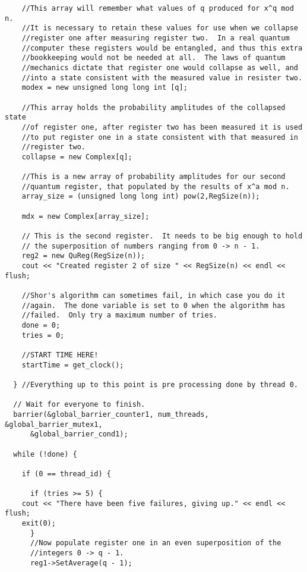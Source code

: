 \documentclass[]{article}
\begin{document}
\begin{verbatim}
    //This array will remember what values of q produced for x^q mod n.
    //It is necessary to retain these values for use when we collapse
    //register one after measuring register two.  In a real quantum
    //computer these registers would be entangled, and thus this extra
    //bookkeeping would not be needed at all.  The laws of quantum
    //mechanics dictate that register one would collapse as well, and
    //into a state consistent with the measured value in resister two.
    modex = new unsigned long long int [q];     
    
    //This array holds the probability amplitudes of the collapsed state
    //of register one, after register two has been measured it is used
    //to put register one in a state consistent with that measured in
    //register two.
    collapse = new Complex[q];
  
    //This is a new array of probability amplitudes for our second
    //quantum register, that populated by the results of x^a mod n.
    array_size = (unsigned long long int) pow(2,RegSize(n));
    
    mdx = new Complex[array_size]; 
    
    // This is the second register.  It needs to be big enough to hold
    // the superposition of numbers ranging from 0 -> n - 1.
    reg2 = new QuReg(RegSize(n)); 
    cout << "Created register 2 of size " << RegSize(n) << endl << flush;
    
    //Shor's algorithm can sometimes fail, in which case you do it
    //again.  The done variable is set to 0 when the algorithm has
    //failed.  Only try a maximum number of tries.
    done = 0;
    tries = 0;
    
    //START TIME HERE!
    startTime = get_clock();
    
  } //Everything up to this point is pre processing done by thread 0.

  // Wait for everyone to finish.
  barrier(&global_barrier_counter1, num_threads, &global_barrier_mutex1, 
	  &global_barrier_cond1);

  while (!done) {
    
    if (0 == thread_id) {
      
      if (tries >= 5) {
	cout << "There have been five failures, giving up." << endl << flush;
	exit(0);
      }
      //Now populate register one in an even superposition of the
      //integers 0 -> q - 1.
      reg1->SetAverage(q - 1);
      

\end{verbatim}
\end{document}
